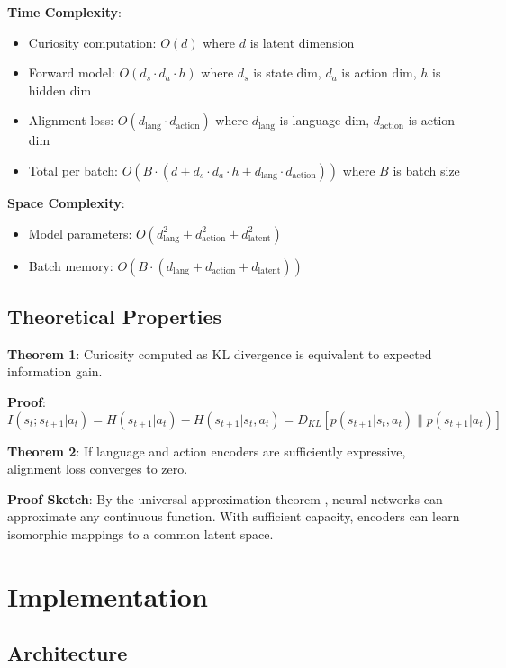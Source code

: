 \documentclass{IEEEtran}
\begin{document}
\textbf{Time Complexity}:
\begin{itemize}
    \item Curiosity computation: $O(d)$ where $d$ is latent dimension
    \item Forward model: $O(d_s \cdot d_a \cdot h)$ where $d_s$ is state dim, $d_a$ is action dim, $h$ is hidden dim
    \item Alignment loss: $O(d_{\text{lang}} \cdot d_{\text{action}})$ where $d_{\text{lang}}$ is language dim, $d_{\text{action}}$ is action dim
    \item Total per batch: $O(B \cdot (d + d_s \cdot d_a \cdot h + d_{\text{lang}} \cdot d_{\text{action}}))$ where $B$ is batch size
\end{itemize}

\textbf{Space Complexity}:
\begin{itemize}
    \item Model parameters: $O(d_{\text{lang}}^2 + d_{\text{action}}^2 + d_{\text{latent}}^2)$
    \item Batch memory: $O(B \cdot (d_{\text{lang}} + d_{\text{action}} + d_{\text{latent}}))$
\end{itemize}

\subsection{Theoretical Properties}

\textbf{Theorem 1}: Curiosity computed as KL divergence is equivalent to expected information gain.

\textbf{Proof}:
\begin{equation}
I(s_t; s_{t+1} | a_t) = H(s_{t+1} | a_t) - H(s_{t+1} | s_t, a_t) = D_{KL}[p(s_{t+1}|s_t, a_t) \| p(s_{t+1}|a_t)]
\end{equation}

\textbf{Theorem 2}: If language and action encoders are sufficiently expressive, alignment loss converges to zero.

\textbf{Proof Sketch}: By the universal approximation theorem \cite{hornik1989}, neural networks can approximate any continuous function. With sufficient capacity, encoders can learn isomorphic mappings to a common latent space.

\section{Implementation}

\subsection{Architecture}
\end{document}
